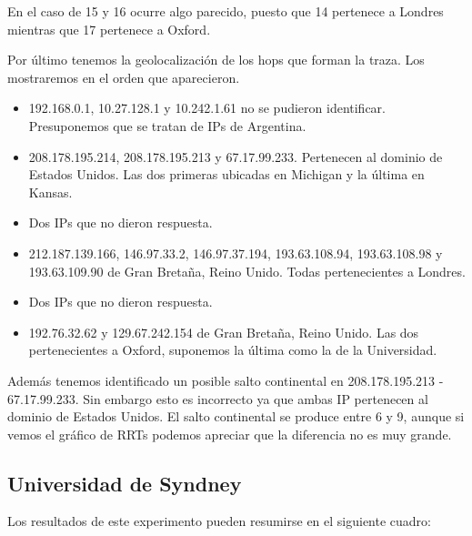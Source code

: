 En el caso de 15 y 16 ocurre algo parecido, puesto que 14 pertenece a Londres mientras que 17 pertenece a
Oxford.

Por último tenemos la geolocalización de los hops que forman la traza. Los mostraremos en el orden que
aparecieron.

\begin{itemize}
\item 192.168.0.1, 10.27.128.1 y 10.242.1.61 no se pudieron identificar. Presuponemos que se tratan de IPs
de Argentina.
\item 208.178.195.214, 208.178.195.213 y 67.17.99.233. Pertenecen al dominio de Estados Unidos. Las dos
primeras ubicadas en Michigan y la última en Kansas.
\item Dos IPs que no dieron respuesta.
\item 212.187.139.166, 146.97.33.2, 146.97.37.194, 193.63.108.94, 193.63.108.98 y 193.63.109.90 de
Gran Bretaña, Reino Unido. Todas pertenecientes a Londres.
\item Dos IPs que no dieron respuesta.
\item 192.76.32.62 y 129.67.242.154 de Gran Bretaña, Reino Unido. Las dos pertenecientes a Oxford, suponemos
la última como la de la Universidad.
\end{itemize}

Además tenemos identificado un posible salto continental en 208.178.195.213 - 67.17.99.233. Sin embargo esto
es incorrecto ya que ambas IP pertenecen al dominio de Estados Unidos. El salto continental se produce entre
6 y 9, aunque si vemos el gráfico de RRTs podemos apreciar que la diferencia no es muy grande.

\newpage

\subsection{Universidad de Syndney}

Los resultados de este experimento pueden resumirse en el siguiente cuadro:

